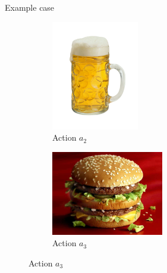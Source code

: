 \documentclass{beamer}
\begin{document}
\begin{frame}{Example case}
\begin{figure}
\begin{subfigure}[b]{0.2\textwidth}
      \includegraphics[width=\textwidth]{ad2.png}
      \caption*{Action $a_2$}
    \end{subfigure}
    \begin{subfigure}[b]{0.2\textwidth}
      \includegraphics[width=\textwidth]{ad3.png}
      \caption*{Action $a_3$}
    \end{subfigure}
  \end{figure}
\end{frame}
\end{document}

